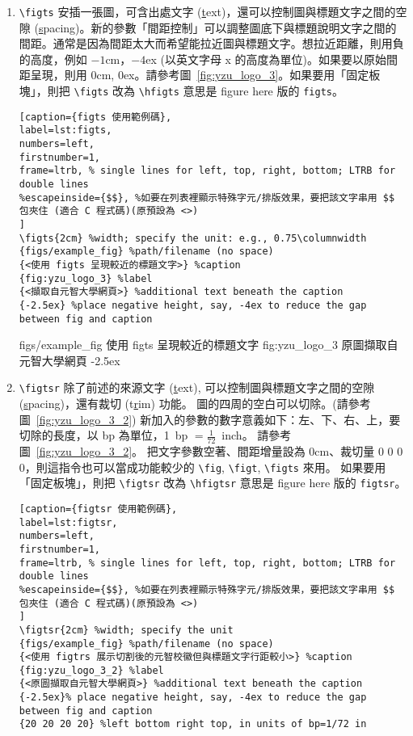 \begin{enumerate}
\item \verb+\figts+ 安插一張圖，可含出處文字 (\uline{t}ext)，還可以控制圖與標題文字之間的空隙 (\uline{s}pacing)。新的參數「間距控制」可以調整圖底下與標題說明文字之間的間距。通常是因為間距太大而希望能拉近圖與標題文字。想拉近距離，則用負的高度，例如 $-1$cm，$-4$ex (以英文字母 x 的高度為單位)。如果要以原始間距呈現，則用 0cm, 0ex。請參考圖~\ref{fig:yzu_logo_3}。如果要用「固定板塊」，則把 \verb+\figts+ 改為 \verb+\hfigts+ 意思是 figure here 版的 \verb+figts+。


{\centering\begin{lstlisting}[caption={figts 使用範例碼},
label=lst:figts,
numbers=left,
firstnumber=1,
frame=ltrb, % single lines for left, top, right, bottom; LTRB for double lines 
%escapeinside={$$}, %如要在列表裡顯示特殊字元/排版效果，要把該文字串用 $$ 包夾住 (適合 C 程式碼)(原預設為 <>)
]
\figts{2cm} %width; specify the unit: e.g., 0.75\columnwidth
{figs/example_fig} %path/filename (no space)
{<使用 figts 呈現較近的標題文字>} %caption
{fig:yzu_logo_3} %label
{<擷取自元智大學網頁>} %additional text beneath the caption
{-2.5ex} %place negative height, say, -4ex to reduce the gap between fig and caption
\end{lstlisting}\par}

%
\figts{2cm} %
{figs/example_fig} %
{使用 figts 呈現較近的標題文字} %
{fig:yzu_logo_3} %
{原圖擷取自元智大學網頁} %
{-2.5ex} %
%

\item \verb+\figtsr+ 除了前述的來源文字 (\uline{t}ext), 可以控制圖與標題文字之間的空隙 (\uline{s}pacing)，還有裁切 (t\uline{r}im) 功能。
圖的四周的空白可以切除。(請參考圖~\ref{fig:yzu_logo_3_2}) 新加入的參數的數字意義如下：左、下、右、上，要切除的長度，以 bp 為單位，1~bp $= \frac{1}{72}$~inch。
請參考圖~\ref{fig:yzu_logo_3_2}。
把文字參數空著、間距增量設為 0cm、裁切量 0 0 0 0，則這指令也可以當成功能較少的 \verb+\fig+, \verb+\figt+, \verb+\figts+ 來用。 如果要用「固定板塊」，則把 \verb+\figtsr+ 改為 \verb+\hfigtsr+ 意思是 figure here 版的 \verb+figtsr+。

{\centering\begin{lstlisting}[caption={figtsr 使用範例碼},
label=lst:figtsr,
numbers=left,
firstnumber=1,
frame=ltrb, % single lines for left, top, right, bottom; LTRB for double lines 
%escapeinside={$$}, %如要在列表裡顯示特殊字元/排版效果，要把該文字串用 $$ 包夾住 (適合 C 程式碼)(原預設為 <>)
]
\figtsr{2cm} %width; specify the unit
{figs/example_fig} %path/filename (no space)
{<使用 figtrs 展示切割後的元智校徽但與標題文字行距較小>} %caption
{fig:yzu_logo_3_2} %label
{<原圖擷取自元智大學網頁>} %additional text beneath the caption
{-2.5ex}% place negative height, say, -4ex to reduce the gap between fig and caption
{20 20 20 20} %left bottom right top, in units of bp=1/72 in
\end{lstlisting}\par}


\end{enumerate}
